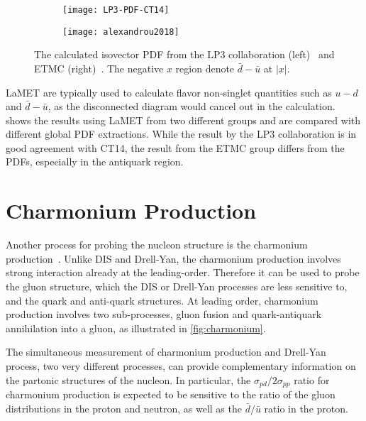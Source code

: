 \documentclass[../main.tex]{subfiles}
\begin{document}
\begin{figure}[h!]
	\centering
	\begin{subfigure}{0.45\linewidth}
		\texttt{[image: LP3-PDF-CT14]}
	\end{subfigure}
	\begin{subfigure}{0.45\linewidth}
		\texttt{[image: alexandrou2018]}
	\end{subfigure}
	\caption{The calculated isovector PDF from the LP3 collaboration (left)~\cite{chen2018}
		and ETMC (right)~\cite{alexandrou2018}.
		The negative $x$ region denote $\bar{d}-\bar{u}$ at $\left|x\right|$.}
	\label{fig:lamet}
\end{figure}
LaMET are typically used to calculate flavor non-singlet quantities such as $u-d$ and $\bar{d}-\bar{u}$,
as the disconnected diagram would cancel out in the calculation.
 shows the results using LaMET from two different groups and are compared with
different global PDF extractions. While the result by the LP3 collaboration
is in good agreement with CT14, the result from the ETMC group differs from the PDFs,
especially in the antiquark region.

\chapter{Charmonium Production}
\label{ch:jpsi}
Another process for probing the nucleon structure is the charmonium production~\cite{peng1995,chang2020}.
Unlike DIS and Drell-Yan, the charmonium production involves strong interaction already
at the leading-order. Therefore it can be used to probe the gluon structure, which 
the DIS or Drell-Yan processes are less sensitive to, and the quark and anti-quark structures.
At leading order, charmonium production involves two sub-processes, gluon fusion and
quark-antiquark annihilation into a gluon, as illustrated in \cref{fig:charmonium}.

The simultaneous measurement of charmonium production and Drell-Yan process, two very different
processes, can provide complementary information on the partonic structures of the nucleon.
In particular, the $\sigma_{pd}/2\sigma_{pp}$ ratio for charmonium
production is expected to be sensitive to the ratio of the gluon distributions in the proton
and neutron, as well as the $\bar{d}/\bar{u}$ ratio in the proton.
\end{document}
